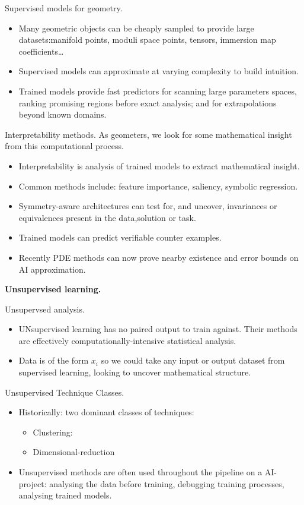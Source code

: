 \medskip\noindent
Supervised models for geometry.
\begin{itemize}
\item Many geometric objects can be cheaply
sampled to provide large datasets:manifold
points, moduli space points, tensors,
immersion map coefficients…
\item Supervised models can approximate at
varying complexity to build intuition.
\item Trained models provide fast predictors
for scanning large parameters spaces,
ranking promising regions before exact
analysis; and for extrapolations beyond
known domains.
\end{itemize}

\medskip\noindent
Interpretability methods.
As geometers, we look for some mathematical
insight from this computational process.
\begin{itemize}
\item Interpretability is analysis of
trained models to extract mathematical
insight.
\item Common methods include: feature
importance, saliency, symbolic regression.
\item Symmetry-aware architectures can
test for, and uncover, invariances or
equivalences present in the data,solution or
task.
\item Trained models can predict verifiable
counter examples.
\item Recently PDE methods can now prove
nearby existence and error bounds on AI
approximation.
\end{itemize}

\medskip\noindent
{\bf Unsupervised learning.}

\medskip\noindent
Unsupervsed analysis.
\begin{itemize}
\item UNsupervised learning has no paired
output to train against. Their methods are
effectively computationally-intensive
statistical analysis.
\item Data is of the form $x_i$ so we could
take any input or output dataset from
supervised learning, looking to uncover
mathematical structure.
\end{itemize} 

\medskip\noindent
Unsupervised Technique Classes.
\begin{itemize}
\item Historically: two dominant classes of
techniques:
\begin{itemize}
\item Clustering:
\item Dimensional-reduction
\end{itemize}
\item Unsupervised methods are often used
throughout the pipeline on a AI-project:
analysing the data before training,
debugging training processes, analysing
trained models.
\end{itemize}

